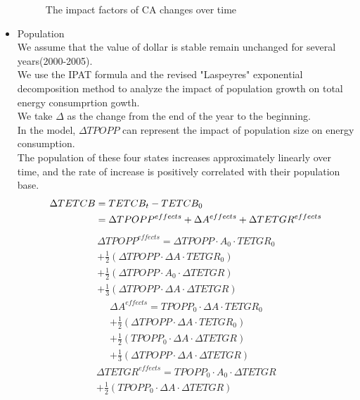 \documentclass{mcmthesis}
\begin{document}
\begin{itemize}
\begin{figure}[h]
		\caption{The impact factors of CA changes over time}
		\label{fig:Industry}
	\end{figure}
	\item Population\\
	We assume that the value of dollar is stable remain unchanged for several years(2000-2005).\\
	We use the IPAT formula and the revised "Laspeyres" exponential decomposition method to analyze the impact of population growth on total energy consumprtion gowth.\cite{IPAT}\\
	We take $ \Delta $ as the change from the end of the year to the beginning.\\
	In the model, $ \Delta TPOPP$ can represent the impact of population size on energy consumption.\\
	The population of these four states increases approximately linearly over time, and the rate of increase is positively correlated with their population base.
	\begin{align}
	\Delta TETCB&=TETCB_{t}-TETCB_{0}\notag\\&=\Delta TPOPP^{effects}+\Delta A^{effects}+\Delta TETGR^{effects}
	\end{align}
	\setlength\multlinegap{4em}
	\setlength\multlinetaggap{8em}
	\begin{multline}
	\Delta TPOPP^{effects}=\Delta TPOPP\cdot A_{0}\cdot TETGR_{0}\\
	+\frac{1}{2}\left ( \Delta TPOPP\cdot \Delta A\cdot TETGR_{0} \right ) \\
	+\frac{1}{2}\left ( \Delta TPOPP\cdot A_{0}\cdot \Delta TETGR \right )\\
	+ \frac{1}{3}\left ( \Delta TPOPP\cdot \Delta A\cdot \Delta TETGR \right)
	\end{multline}
	\begin{multline}
	\Delta A^{effects}= TPOPP_{0}\cdot \Delta A\cdot TETGR_{0}\\
	+\frac{1}{2}\left ( \Delta TPOPP\cdot \Delta A\cdot TETGR_{0} \right ) \\
	+\frac{1}{2}\left ( TPOPP_{0}\cdot \Delta A\cdot \Delta TETGR \right )\\
	+\frac{1}{3}\left ( \Delta TPOPP\cdot \Delta A\cdot \Delta TETGR \right )
	\end{multline}
	\begin{multline}
	\Delta TETGR^{effects}= TPOPP_{0}\cdot A_{0}\cdot \Delta TETGR\\
	+\frac{1}{2}\left ( TPOPP_{0}\cdot \Delta A\cdot \Delta TETGR \right )\\

\end{multline}
\end{itemize}
\end{document}
